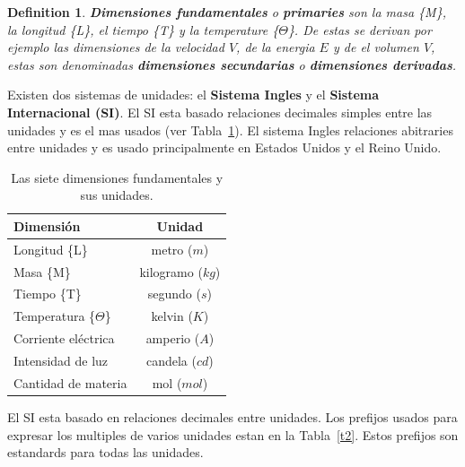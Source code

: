 \documentclass[10pt, oneside]{article}
\newtheorem{defn}{Definition}
\begin{document}
\begin{defn}
\textbf{Dimensiones fundamentales} o \textbf{primaries} son la masa \{M\}, la longitud \{L\}, el tiempo \{T\} y la temperature \{$\Theta$\}. De estas se derivan por ejemplo las dimensiones de la velocidad $V$, de la energia $E$ y de el volumen $V$, estas son denominadas \textbf{dimensiones secundarias} o \textbf{dimensiones derivadas}.
\end{defn}

Existen dos sistemas de unidades: el \textbf{Sistema Ingles} y el \textbf{Sistema Internacional (SI)}. El SI esta basado relaciones decimales simples entre las unidades y es el mas usados (ver Tabla~\ref{t1}). El sistema Ingles relaciones abitraries entre unidades y es usado principalmente en Estados Unidos y el Reino Unido. 

\begin{table}[h!]
\centering
\begin{tabular}{l c}
 \hline
 Dimensi\'on & Unidad \\ [0.5ex]
 \hline\hline
 Longitud \{L\} & metro ($m$)  \\
 Masa \{M\} & kilogramo ($kg$)  \\
 Tiempo \{T\} & segundo ($s$)  \\
 Temperatura \{$\Theta$\} & kelvin ($K$)  \\
 Corriente el\'ectrica & amperio ($A$)  \\
 Intensidad de luz &  candela ($cd$) \\ 
 Cantidad de materia & mol ($mol$)  \\ [1ex]
 \hline
\end{tabular}
\caption{Las siete dimensiones fundamentales y sus unidades.}
\label{t1}
\end{table}

El SI esta basado en relaciones decimales entre unidades. Los prefijos usados para expresar los multiples de varios unidades estan en la Tabla~\ref{t2}. Estos prefijos son estandards para todas las unidades.
\end{document}
